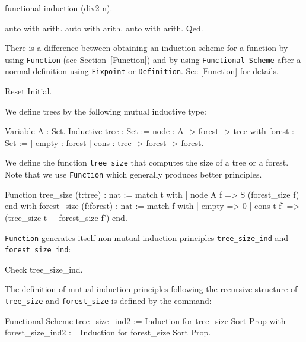 \begin{coq_example}
functional induction (div2 n).
\end{coq_example}

\begin{coq_example*}
auto with arith.
auto with arith.
auto with arith.
Qed.
\end{coq_example*}

\Rem There is a difference between obtaining an induction scheme for a
function by using \texttt{Function} (see Section~\ref{Function}) and by
using \texttt{Functional Scheme} after a normal definition using
\texttt{Fixpoint} or \texttt{Definition}. See \ref{Function} for
details.



\begin{coq_eval}
Reset Initial.
\end{coq_eval}

We define trees by the following mutual inductive type:

\begin{coq_example*}
Variable A : Set.
Inductive tree : Set :=
    node : A -> forest -> tree
with forest : Set :=
  | empty : forest
  | cons : tree -> forest -> forest.
\end{coq_example*}

We define the function \texttt{tree\_size} that computes the size
of a tree or a forest. Note that we use \texttt{Function} which
generally produces better principles.

\begin{coq_example*}
Function tree_size (t:tree) : nat :=
  match t with
  | node A f => S (forest_size f)
  end
 with forest_size (f:forest) : nat :=
  match f with
  | empty => 0
  | cons t f' => (tree_size t + forest_size f')
  end.
\end{coq_example*}

\Rem \texttt{Function} generates itself non mutual induction
principles {\tt tree\_size\_ind} and {\tt forest\_size\_ind}:

\begin{coq_example}
Check tree_size_ind.
\end{coq_example}

The definition of mutual induction principles following the recursive
structure of \texttt{tree\_size} and \texttt{forest\_size} is defined
by the command:

\begin{coq_example*}
Functional Scheme tree_size_ind2 := Induction for tree_size Sort Prop
with forest_size_ind2 := Induction for forest_size Sort Prop.
\end{coq_example*}

